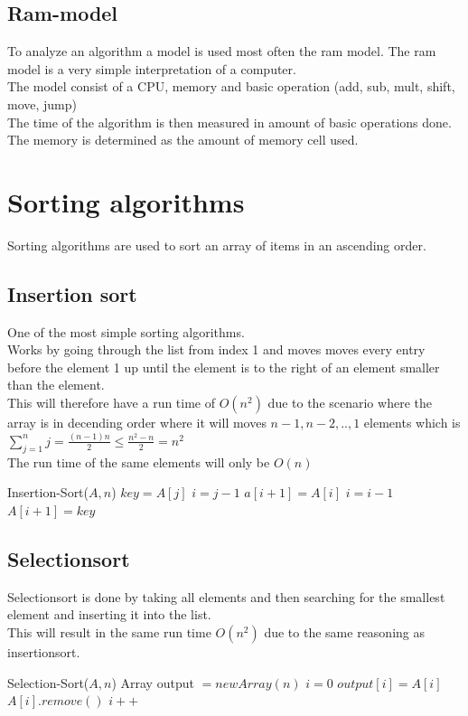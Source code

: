 \documentclass[12pt, a4paper]{article}
\begin{document}
			\subsection{Ram-model}
				To analyze an algorithm a model is used most often the ram model.
				The ram model is a very simple interpretation of a computer.\\
				The model consist of a CPU, memory and basic operation (add, sub, mult, shift, move, jump)\\
				The time of the algorithm is then measured in amount of basic operations done.\\
				The memory is determined as the amount of memory cell used.
		\section{Sorting algorithms}
			Sorting algorithms are used to sort an array of items in an ascending order.\\
			\subsection{Insertion sort}
				One of the most simple sorting algorithms.\\
				Works by going through the list from index 1 and moves moves every entry before the element 1 up until the element is to the right of an element smaller than the element.\\
				This will therefore have a run time of $O(n^2)$ due to the scenario where the array is in decending order where it will moves $n-1,n-2,..,1$ elements which is $\sum\limits_{j=1}^nj=\frac{(n-1)n}{2}\leq\frac{n^2-n}{2}=n^2$\\
				The run time of the same elements will only be $O(n)$
				\begin{algorithmic}[1]
					\State Insertion-Sort($A,n$)
						\State $key = A[j]$
						\State $i=j-1$
							\State $a[i+1]=A[i]$
							\State $i = i-1$
						\EndWhile
						\State $A[i+1]=key$
					\EndFor
				\end{algorithmic}
			\subsection{Selectionsort}
				Selectionsort is done by taking all elements and then searching for the smallest element and inserting it into the list.\\
				This will result in the same run time $O(n^2)$ due to the same reasoning as insertionsort.\\
				\begin{algorithmic}[1]
					\State Selection-Sort($A,n$)
					\State Array output $= new Array(n)$
					\State $i = 0$
						\State $output[i] = A[i]$
						\State $A[i].remove()$
						\State $i++$
					\EndWhile
				\end{algorithmic}
\end{document}
